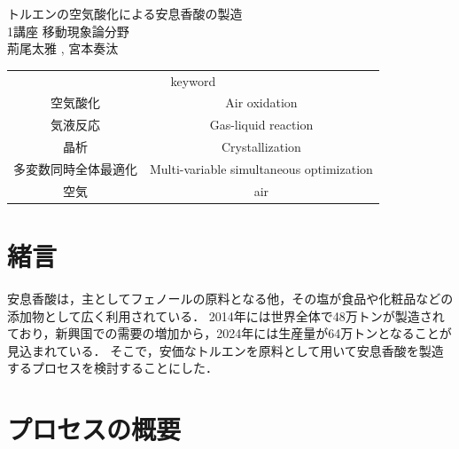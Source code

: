 \documentclass[a4j]{jsreport}
\begin{document}
\begin{titlepage}
\vspace{5cm}
\centering
{\Huge トルエンの空気酸化による安息香酸の製造} \\
\vspace{2cm}
\centering
{\Large 1講座 移動現象論分野} \\
\vspace{0.5cm}
\centering
{\large 荊尾太雅 , 宮本奏汰} \\
\vspace{3cm}
\begin{table}[htbp]
    \begin{center}
        \begin{tabular}[htbp]{cc}
            \multicolumn{2}{c}{{\LARGE keyword}} \\
            {\Large 空気酸化}&{\Large Air oxidation} \\
            {\Large 気液反応}&{\Large Gas-liquid reaction} \\
            {\Large 晶析}&{\Large Crystallization} \\
            {\Large 多変数同時全体最適化}&{\Large Multi-variable simultaneous optimization} \\
            {\Large 空気}&{\Large air} \\
        \end{tabular}
    \end{center}
\end{table}
\end{titlepage}


\setcounter{tocdepth}{2}
\tableofcontents

\clearpage
{}

\chapter{緒言}
安息香酸は，主としてフェノールの原料となる他，その塩が食品や化粧品などの添加物として広く利用されている．
2014年には世界全体で48万トンが製造されており，新興国での需要の増加から，2024年には生産量が64万トンとなることが見込まれている\cite{}．
そこで，安価なトルエンを原料として用いて安息香酸を製造するプロセスを検討することにした．


\clearpage
\chapter{プロセスの概要}
\end{document}
